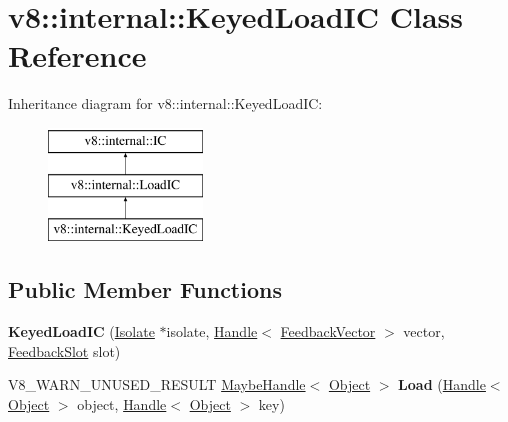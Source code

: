\hypertarget{classv8_1_1internal_1_1KeyedLoadIC}{}\section{v8\+:\+:internal\+:\+:Keyed\+Load\+IC Class Reference}
\label{classv8_1_1internal_1_1KeyedLoadIC}
Inheritance diagram for v8\+:\+:internal\+:\+:Keyed\+Load\+IC\+:\begin{figure}[H]
\begin{center}
\leavevmode
\includegraphics[height=3.000000cm]{classv8_1_1internal_1_1KeyedLoadIC}
\end{center}
\end{figure}
\subsection*{Public Member Functions}
\begin{DoxyCompactItemize}
\item 
\mbox{\label{classv8_1_1internal_1_1KeyedLoadIC_af798012163eb907195dd3709729e17de}} 
{\bfseries Keyed\+Load\+IC} (\mbox{\hyperlink{classv8_1_1internal_1_1Isolate}{Isolate}} $\ast$isolate, \mbox{\hyperlink{classv8_1_1internal_1_1Handle}{Handle}}$<$ \mbox{\hyperlink{classv8_1_1internal_1_1FeedbackVector}{Feedback\+Vector}} $>$ vector, \mbox{\hyperlink{classv8_1_1internal_1_1FeedbackSlot}{Feedback\+Slot}} slot)
\item 
\mbox{\label{classv8_1_1internal_1_1KeyedLoadIC_a0fb4a0354f4a4be12080a71e9560a676}} 
V8\+\_\+\+W\+A\+R\+N\+\_\+\+U\+N\+U\+S\+E\+D\+\_\+\+R\+E\+S\+U\+LT \mbox{\hyperlink{classv8_1_1internal_1_1MaybeHandle}{Maybe\+Handle}}$<$ \mbox{\hyperlink{classv8_1_1internal_1_1Object}{Object}} $>$ {\bfseries Load} (\mbox{\hyperlink{classv8_1_1internal_1_1Handle}{Handle}}$<$ \mbox{\hyperlink{classv8_1_1internal_1_1Object}{Object}} $>$ object, \mbox{\hyperlink{classv8_1_1internal_1_1Handle}{Handle}}$<$ \mbox{\hyperlink{classv8_1_1internal_1_1Object}{Object}} $>$ key)
\end{DoxyCompactItemize}
